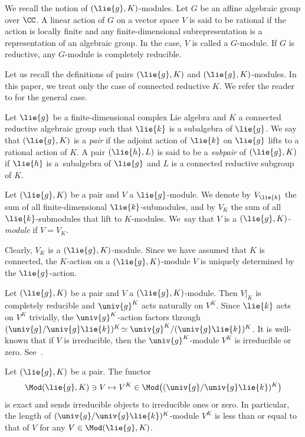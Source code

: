 We recall the notion of $(\lie{g}, K)$-modules.
Let $G$ be an affine algebraic group over $\CC$.
A linear action of $G$ on a vector space $V$ is said to be rational
if the action is locally finite and any finite-dimensional subrepresentation is a representation of an algebraic group.
In the case, $V$ is called a $G$-module.
If $G$ is reductive, any $G$-module is completely reducible.

Let us recall the definitions of pairs $(\lie{g}, K)$ and $(\lie{g}, K)$-modules.
In this paper, we treat only the case of connected reductive $K$.
We refer the reader to \cite[Chapter~I]{KnVo95_cohomological_induction} for the general case.

\begin{Definition}\label{def:pair}
	Let $\lie{g}$ be a finite-dimensional complex Lie algebra and $K$ a connected reductive algebraic group
	such that $\lie{k}$ is a subalgebra of $\lie{g}$.
	We say that $(\lie{g}, K)$ is a \emph{pair} if the adjoint action of $\lie{k}$ on $\lie{g}$ lifts to a rational action of $K$.
	A pair $(\lie{h}, L)$ is said to be a \emph{subpair} of $(\lie{g}, K)$ if $\lie{h}$ is a~subalgebra of $\lie{g}$
	and $L$ is a connected reductive subgroup of $K$.
\end{Definition}

\begin{Definition}\label{def:GKmod}
	Let $(\lie{g}, K)$ be a pair and $V$ a $\lie{g}$-module.
	We denote by $V_{\lie{k}}$ the sum of all finite-dimensional $\lie{k}$-submodules,
	and by $V_K$ the sum of all $\lie{k}$-submodules that lift to $K$-modules.
	We~say that $V$ is a \emph{$(\lie{g}, K)$-module} if $V = V_K$.
\end{Definition}

Clearly, $V_K$ is a $(\lie{g}, K)$-module.
Since we have assumed that $K$ is connected, the $K$-action on a $(\lie{g}, K)$-module $V$ is uniquely determined by the $\lie{g}$-action.

Let $(\lie{g}, K)$ be a pair and $V$ a $(\lie{g}, K)$-module.
Then $V|_K$ is completely reducible and $\univ{g}^K$ acts naturally on $V^K$.
Since $\lie{k}$ acts on $V^K$ trivially, the $\univ{g}^K$-action factors through $(\univ{g}/\univ{g}\lie{k})^K \!\simeq \univ{g}^K/(\univ{g}\lie{k})^K$.
It is well-known that if $V$ is irreducible, then the $\univ{g}^K$-module $V^K$ is irreducible or zero.
See~\cite[Theorem~4.2.1]{GoWa09}.

\begin{Proposition}\label{prop:UKaction}
	Let $(\lie{g}, K)$ be a pair.
	The functor
 \[
 \Mod(\lie{g}, K) \ni V \mapsto V^K \in \Mod\bigl((\univ{g}/\univ{g}\lie{k})^K\bigr)
 \]
 is exact and
	sends irreducible objects to irreducible ones or zero.
	In particular, the length of $(\univ{g}/\univ{g}\lie{k})^K$-module $V^K$ is less than or equal to that of $V$
	for any $V \in \Mod(\lie{g}, K)$.
\end{Proposition}

